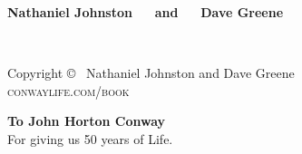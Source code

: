 \documentclass[11pt]{book}
\begin{document}
\vspace*{5.55in}\textbf{\textsf{{\fontsize{16}{40}\selectfont Nathaniel Johnston} $\quad$ and $\quad$ {\fontsize{16}{40}\selectfont Dave Greene}}}
\vfill
\endgroup
\newpage
\fi


~\vfill
\thispagestyle{empty}

\noindent Copyright \copyright\ {\the\year} Nathaniel Johnston and Dave Greene\\ %


\noindent \textsc{conwaylife.com/book}\\ %



\clearpage

\vspace*{1.5in}
\begin{center}
	\textbf{\large To John Horton Conway}\\For giving us 50 years of Life.
\end{center}






\setcounter{tocdepth}{1}
\pagestyle{empty} %

\tableofcontents %

\cleardoublepage %

\pagestyle{fancy} %


\renewcommand{\chaptermark}[1]{\markboth{\sffamily\normalsize\bfseries Preface}{}} %
\end{document}
